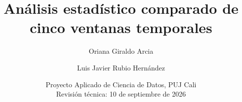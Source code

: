\documentclass[11pt,a4paper]{article}
\title{\color{azul}Análisis estadístico comparado de cinco ventanas temporales}
\author{Oriana Giraldo Arcia \and Luis Javier Rubio Hernández}
\date{Proyecto Aplicado de Ciencia de Datos, PUJ Cali\\Revisión técnica: 10 de septiembre de 2026}
\renewcommand{\tablename}{Tabla}
\begin{document}
\renewcommand{\tablename}{Tabla}
\maketitle

\par\vspace{6pt}


\end{document}
